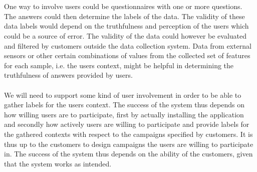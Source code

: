 \\\\
One way to involve users could be questionnaires with one or more questions. The answers could then determine the labels of the data. The validity of these data labels would depend on the truthfulness and perception of the users which could be a source of error. The validity of the data could however be evaluated and filtered by customers outside the data collection system. Data from external sensors or other certain combinations of values from the collected set of features for each sample, i.e. the users context, might be helpful in determining the truthfulness of answers provided by users.
\\\\
We will need to support some kind of user involvement in order to be able to gather labels for the users context. The success of the system thus depends on how willing users are to participate, first by actually installing the application and secondly how actively users are willing to participate and provide labels for the gathered contexts with respect to the campaigns specified by customers. It is thus up to the customers to design campaigns the users are willing to participate in. The success of the system thus depends on the ability of the customers, given that the system works as intended.
